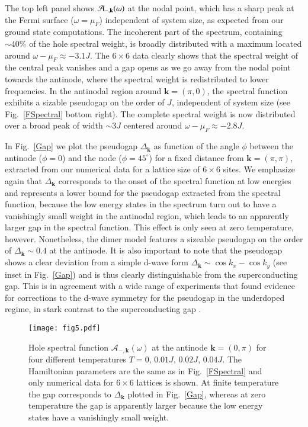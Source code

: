 \documentclass[aps,pra,reprint,showpacs,superscriptaddress]{revtex4-1}
\begin{document}
The top left panel shows $\mathcal{A}_{-,\bold{k}}(\omega)$ at the nodal point, which has a sharp peak at the Fermi surface ($\omega=\mu_F$) independent of system size, as expected from our ground state computations. The incoherent part of the spectrum, containing $\sim 40 \%$ of the hole spectral weight, is broadly distributed with a maximum located around $\omega-\mu_F \approx -3.1J$.
The $6\times6$ data clearly shows that the spectral weight of the central peak vanishes and a gap opens as we go away from the nodal point towards the antinode, where the spectral weight is redistributed to lower frequencies. In the antinodal region around $\mathbf{k}=(\pi,0)$, the spectral function exhibits a sizable pseudogap on the order of $J$, independent of system size (see Fig.~\ref{FSpectral} bottom right).
 The complete spectral weight is now distributed over a broad peak of width $\sim3J$ centered around $\omega-\mu_F \approx -2.8J$. 

In Fig.~\ref{Gap} we plot the pseudogap $\Delta_\mathbf{k}$ as function of the angle $\phi$ between the antinode ($\phi=0$) and the node ($\phi=45^\circ$) for a fixed distance from $\mathbf{k}=(\pi,\pi)$, extracted from our numerical data for a lattice size of $6\times6$ sites. We emphasize again that $\Delta_\mathbf{k}$ corresponds to the onset of the spectral function at low energies and represents a lower bound for the pseudogap extracted from the spectral function, because the low energy states in the spectrum turn out to have a vanishingly small weight in the antinodal region, which leads to an apparently larger gap in the spectral function. This effect is only seen at zero temperature, however. Nonetheless, the dimer model features a sizeable pseudogap on the order of $\Delta_\mathbf{k} \sim 0.4$ at the antinode. It is also important to note that the pseudogap shows a clear deviation from a simple d-wave form $\Delta_\mathbf{k} \sim \cos k_x -\cos k_y$ (see inset in Fig.~\ref{Gap}) and is thus clearly distinguishable from the superconducting gap. This is in agreement with a wide range of experiments that found evidence for corrections to the d-wave symmetry for the pseudogap in the underdoped regime, in stark contrast to the superconducting gap \cite{hussain2007abrupt,vishik2010arpes,loret2017vertical}. 


\begin{figure}
\centering
\texttt{[image: fig5.pdf]}
\caption{Hole spectral function $\mathcal{A}_{-,\mathbf{k}}(\omega)$ at the antinode $\mathbf{k}=(0,\pi)$ for four different temperatures $T=0, \, 0.01J, \, 0.02J, \, 0.04J$. The Hamiltonian parameters are the same as in Fig.~\ref{FSpectral} and only numerical data for $6\times6$ lattices is shown. At finite temperature the gap corresponds to $\Delta_\mathbf{k}$ plotted in Fig.~\ref{Gap}, whereas at zero temperature the gap is apparently larger because the low energy states have a vanishingly small weight.}
\label{SF_T}
\end{figure}
\end{document}
